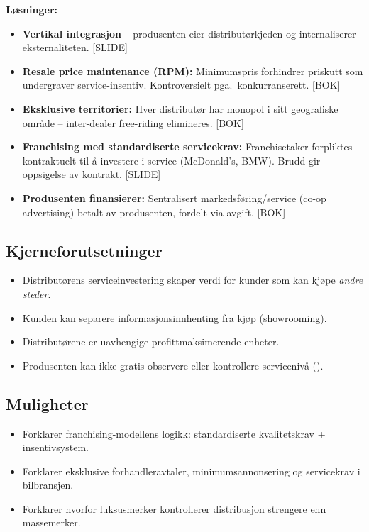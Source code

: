 \textbf{Løsninger:}
\begin{itemize}\setlength{\itemsep}{2pt}
\item \textbf{Vertikal integrasjon} -- produsenten eier distributørkjeden og internaliserer eksternaliteten. [SLIDE]
\item \textbf{Resale price maintenance (RPM):} Minimumspris forhindrer priskutt som undergraver service-insentiv. Kontroversielt pga.\ konkurranserett. [BOK]
\item \textbf{Eksklusive territorier:} Hver distributør har monopol i sitt geografiske område -- inter-dealer free-riding elimineres. [BOK]
\item \textbf{Franchising med standardiserte servicekrav:} Franchisetaker forpliktes kontraktuelt til å investere i service (McDonald's, BMW). Brudd gir oppsigelse av kontrakt. [SLIDE]
\item \textbf{Produsenten finansierer:} Sentralisert markedsføring/service (co-op advertising) betalt av produsenten, fordelt via avgift. [BOK]
\end{itemize}

\subsection*{Kjerneforutsetninger}
\begin{itemize}
\item Distributørens serviceinvestering skaper verdi for kunder som kan kjøpe \emph{andre steder}.
\item Kunden kan separere informasjonsinnhenting fra kjøp (showrooming).
\item Distributørene er uavhengige profittmaksimerende enheter.
\item Produsenten kan ikke gratis observere eller kontrollere servicenivå ().
\end{itemize}

\subsection*{Muligheter}
\begin{itemize}
\item Forklarer franchising-modellens logikk: standardiserte kvalitetskrav + insentivsystem.
\item Forklarer eksklusive forhandleravtaler, minimumsannonsering og servicekrav i bilbransjen.
\item Forklarer hvorfor luksusmerker kontrollerer distribusjon strengere enn massemerker.
\end{itemize}

